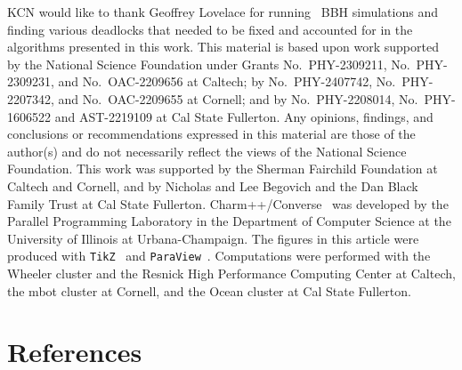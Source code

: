 \begin{bibunit}[unsrtnat]


\acknowledgements

KCN would like to thank Geoffrey Lovelace for running \spectre~BBH simulations
and finding various deadlocks that needed to be fixed and accounted for in the
algorithms presented in this work. This material is based upon work supported by
the National Science Foundation under Grants No.~PHY-2309211, No.~PHY-2309231,
and No.~OAC-2209656 at Caltech; %
by No.~PHY-2407742, No.~PHY-2207342, and No.~OAC-2209655 at Cornell; and by
No.~PHY-2208014, No.~PHY-1606522 and AST-2219109 at Cal State Fullerton. Any
opinions, findings, and conclusions or recommendations expressed in this
material are those of the author(s) and do not necessarily reflect the views of
the National Science Foundation. This work was supported by the Sherman
Fairchild Foundation at Caltech and Cornell, and by Nicholas and Lee Begovich
and the Dan Black Family Trust at Cal State Fullerton.
Charm++/Converse~\cite{laxmikant_kale_2020_3972617} was developed by the
Parallel Programming Laboratory in the Department of Computer Science at the
University of Illinois at Urbana-Champaign. The figures in this article were
produced with \texttt{TikZ}~\cite{tikz} and
\texttt{ParaView}~\cite{paraview, paraview2}. Computations were performed with
the Wheeler cluster and the Resnick High Performance Computing Center at
Caltech, the mbot cluster at Cornell, and the Ocean cluster at Cal State
Fullerton.


\section*{References}
\putbib[nelli_et_al]

\end{bibunit}